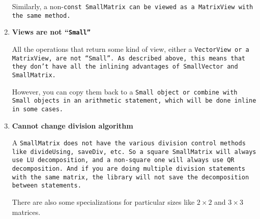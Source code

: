 \begin{enumerate}
Similarly, a non-\tt{const} \tt{SmallMatrix} can be viewed as a \tt{MatrixView}
with the same method.

\item
\textbf{Views are not ``\tt{Small}''}

All the operations that return some kind of view,
either a \tt{VectorView} or a \tt{MatrixView}, are not ``\tt{Small}''.
As described above, this means that they don't have all the inlining advantages of 
\tt{SmallVector} and \tt{SmallMatrix}.  

However, you can copy them back to a \tt{Small} object or combine
with \tt{Small} objects in an arithmetic statement, which will be done inline
in some cases.

\item
\textbf{Cannot change division algorithm}

A \tt{SmallMatrix} does not have the various division control methods 
like \tt{divideUsing}, \tt{saveDiv}, etc.
So a square \tt{SmallMatrix} will always use
LU decomposition, and a non-square one will always use QR decomposition.
And if you are doing multiple division statements with the same matrix,
the library will not save the decomposition between statements.  

There are also some specializations for particular sizes like $2 \times 2$ and $3 \times 3$
matrices.

\end{enumerate}

